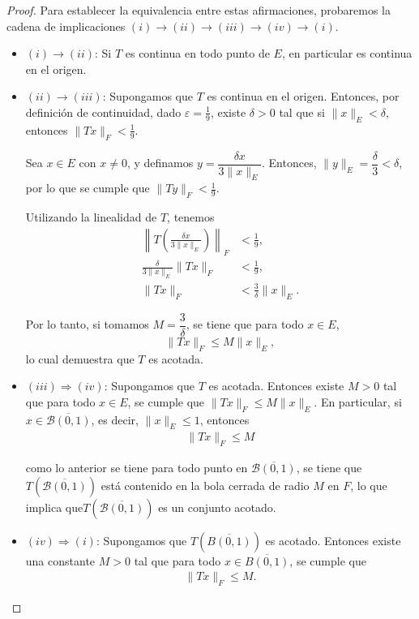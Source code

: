 \begin{proof}
\hfil
Para establecer la equivalencia entre estas afirmaciones, probaremos la cadena de implicaciones $(i) \rightarrow (ii) \rightarrow (iii) \rightarrow (iv) \rightarrow (i)$.
\begin{itemize}
    \item $(i) \rightarrow (ii)$:  
    Si $T$ es continua en todo punto de $E$, en particular es continua en el origen.

    \item $(ii) \rightarrow (iii)$:  
    Supongamos que $T$ es continua en el origen. Entonces, por definición de continuidad, dado $\varepsilon = \frac{1}{9}$, existe $\delta > 0$ tal que si $\|x\|_E < \delta$, entonces $\|T x\|_F < \frac{1}{9}$.

    Sea $x \in E$ con $x \neq 0$, y definamos $y = \dfrac{\delta x}{3 \|x\|_E}$. Entonces, $\|y\|_E = \dfrac{\delta}{3} < \delta$, por lo que se cumple que $\|T y\|_F < \frac{1}{9}$.

    Utilizando la linealidad de $T$, tenemos
    \begin{align*}
        \left\| T\left( \frac{\delta x}{3\|x\|_E} \right) \right\|_F &< \frac{1}{9}, \\
        \frac{\delta}{3\|x\|_E} \|T x\|_F &< \frac{1}{9}, \\
        \|T x\|_F &< \frac{3}{\delta} \|x\|_E.
    \end{align*}

    Por lo tanto, si tomamos $M = \dfrac{3}{\delta}$, se tiene que para todo $x \in E$, 
    \[
    \|T x\|_F \leq M \|x\|_E,
    \]
    lo cual demuestra que $T$ es acotada.

   \item $(iii) \Rightarrow (iv)$:  
    Supongamos que $T$ es acotada. Entonces existe $M > 0$ tal que para todo $x \in E$, se cumple que $\|T x\|_F \leq M \|x\|_E$. En particular, si $x \in \overline{\mathcal{B}(0,1)}$, es decir, $\|x\|_E \leq 1$, entonces
    \begin{align*}
       \|T x\|_F \leq M \end{align*}
    
     como lo anterior se tiene para todo punto en $\overline{\mathcal{B}(0,1)}$, se tiene que  $T(\overline{\mathcal{B}(0,1)})$ está contenido en la bola cerrada de radio $M$ en $F$, lo que implica que$ T(\overline{\mathcal{B}(0,1)})$ es un conjunto acotado.

    \item $(iv) \Rightarrow (i)$:  
    Supongamos que $T(\overline{B(0,1)})$ es acotado. Entonces existe una constante $M> 0$ tal que para todo $x \in \overline{B(0,1)}$, se cumple que
    \begin{align*}
         \|T x\|_F \leq M
    .\end{align*}
   

\end{itemize}
\end{proof}
